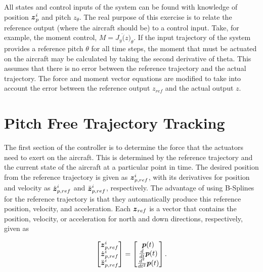 All states and control inputs of the system can be found with knowledge of position $\boldsymbol{z}^i_p$ and pitch $z_{\theta}$. 
The real purpose of this exercise is to relate the reference output (where the aircraft should be) to a control input.
Take, for example, the moment control, $M = J_y \ddot(z)_{\theta}$.
If the input trajectory of the system provides a reference pitch $\theta$ for all time steps, the moment that must be actuated on the aircraft may be calculated by taking the second derivative of theta.
This assumes that there is no error between the reference trajectory and the actual trajectory. 
The force and moment vector equations are modified to take into account the error between the reference output $z_{ref}$ and the actual output $z$.

\section{Pitch Free Trajectory Tracking}
\label{sec:PitchFree}

The first section of the controller is to determine the force that the actuators need to exert on the aircraft. 
This is determined by the reference trajectory and the current state of the aircraft at a particular point in time. 
The desired position from the reference trajectory is given as $\boldsymbol{z}_{p,ref}^{i}$, with its derivatives for position and velocity as $\dot{\boldsymbol{z}}_{p,ref}^{i}$ and $\ddot{\boldsymbol{z}}_{p,ref}^i$, respectively. 
The advantage of using B-Splines for the reference trajectory is that they automatically produce this reference position, velocity, and acceleration. 
Each $\boldsymbol{z}_{ref}$ is a vector that contains the position, velocity, or acceleration for north and down directions, respectively, given as

\begin{align}
    \begin{bmatrix}
        \boldsymbol{z}_{p,ref}^{i}\\
        \dot{\boldsymbol{z}}_{p,ref}^{i}\\
        \ddot{\boldsymbol{z}}_{p,ref}^i\\
    \end{bmatrix}
    =
    \begin{bmatrix}
        \boldsymbol{p}(t)\\
        \frac{d}{dt}\boldsymbol{p}(t)\\
        \frac{d^2}{dt^2}\boldsymbol{p}(t)\\
    \end{bmatrix}
    .
\end{align}


